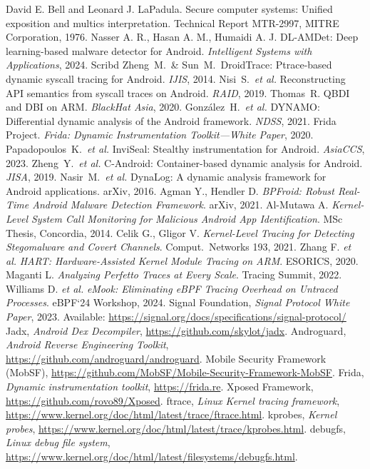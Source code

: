 \documentclass[a4paper,12pt]{report}
\begin{document}
\begin{thebibliography}{99}
David E. Bell and Leonard J. LaPadula.
\newblock Secure computer systems: Unified exposition and multics interpretation.
\newblock Technical Report MTR-2997, MITRE Corporation, 1976.
    Nasser A. R., Hasan A. M., Humaidi A. J. DL-AMDet: Deep learning-based malware detector for Android. \textit{Intelligent Systems with Applications}, 2024. Scribd
     Zheng~M.\ \& Sun~M.\ DroidTrace: Ptrace-based dynamic syscall tracing for Android. \textit{IJIS}, 2014.
     Nisi~S.\ \emph{et al.} Reconstructing API semantics from syscall traces on Android. \textit{RAID}, 2019.
     Thomas~R. QBDI and DBI on ARM. \textit{BlackHat Asia}, 2020.
     González~H.\ \emph{et al.} DYNAMO: Differential dynamic analysis of the Android framework. \textit{NDSS}, 2021.
     Frida Project. \textit{Frida: Dynamic Instrumentation Toolkit—White Paper}, 2020.
     Papadopoulos~K.\ \emph{et al.} InviSeal: Stealthy instrumentation for Android. \textit{AsiaCCS}, 2023.
     Zheng~Y.\ \emph{et al.} C-Android: Container-based dynamic analysis for Android. \textit{JISA}, 2019.
     Nasir~M.\ \emph{et al.} DynaLog: A dynamic analysis framework for Android applications. arXiv, 2016.
     Agman Y., Hendler D. \emph{BPFroid: Robust Real-Time Android Malware Detection Framework}. arXiv, 2021.
     Al-Mutawa A. \emph{Kernel-Level System Call Monitoring for Malicious Android App Identification}. MSc Thesis, Concordia, 2014.
     Celik G., Gligor V. \emph{Kernel-Level Tracing for Detecting Stegomalware and Covert Channels}. Comput.\ Networks 193, 2021.
     Zhang F. \emph{et al.} \emph{HART: Hardware-Assisted Kernel Module Tracing on ARM}. ESORICS, 2020.
     Maganti L. \emph{Analyzing Perfetto Traces at Every Scale}. Tracing Summit, 2022.
     Williams D. \emph{et al.} \emph{eMook: Eliminating eBPF Tracing Overhead on Untraced Processes}. eBPF‘24 Workshop, 2024.
     Signal Foundation, \textit{Signal Protocol White Paper}, 2023. Available: \url{https://signal.org/docs/specifications/signal-protocol/}
 Jadx, \textit{Android Dex Decompiler}, \url{https://github.com/skylot/jadx}.
 Androguard, \textit{Android Reverse Engineering Toolkit}, \url{https://github.com/androguard/androguard}.
 Mobile Security Framework (MobSF), \url{https://github.com/MobSF/Mobile-Security-Framework-MobSF}.
 Frida, \textit{Dynamic instrumentation toolkit}, \url{https://frida.re}.
 Xposed Framework, \url{https://github.com/rovo89/Xposed}.
 ftrace, \textit{Linux Kernel tracing framework}, \url{https://www.kernel.org/doc/html/latest/trace/ftrace.html}.
 kprobes, \textit{Kernel probes}, \url{https://www.kernel.org/doc/html/latest/trace/kprobes.html}.
 debugfs, \textit{Linux debug file system}, \url{https://www.kernel.org/doc/html/latest/filesystems/debugfs.html}.


\end{thebibliography}
\end{document}
